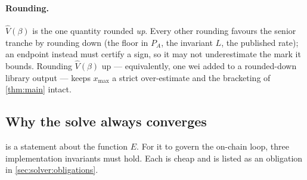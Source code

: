 \paragraph{Rounding.}
$\widehat{V}(\beta)$ is the one quantity rounded \emph{up}. Every other
rounding favours the senior tranche by rounding down (the floor in $P_A$,
the invariant $L$, the published rate); an endpoint instead must certify a
sign, so it may not underestimate the mark it bounds. Rounding
$\widehat{V}(\beta)$ up --- equivalently, one wei added to a rounded-down
library output --- keeps $x_{\max}$ a strict over-estimate and the
bracketing of \cref{thm:main} intact.

\subsection{Why the solve always converges}
\label{sec:solver:convergence}

 is a statement about the function $E$. For it to govern
the on-chain loop, three implementation invariants must hold. Each is
cheap and is listed as an obligation in \cref{sec:solver:obligations}.

